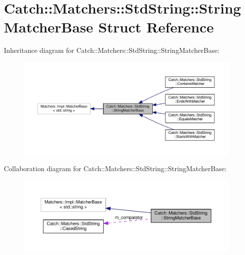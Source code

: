 \hypertarget{structCatch_1_1Matchers_1_1StdString_1_1StringMatcherBase}{}\section{Catch\+:\+:Matchers\+:\+:Std\+String\+:\+:String\+Matcher\+Base Struct Reference}
\label{structCatch_1_1Matchers_1_1StdString_1_1StringMatcherBase}


Inheritance diagram for Catch\+:\+:Matchers\+:\+:Std\+String\+:\+:String\+Matcher\+Base\+:\nopagebreak
\begin{figure}[H]
\begin{center}
\leavevmode
\includegraphics[width=350pt]{structCatch_1_1Matchers_1_1StdString_1_1StringMatcherBase__inherit__graph}
\end{center}
\end{figure}


Collaboration diagram for Catch\+:\+:Matchers\+:\+:Std\+String\+:\+:String\+Matcher\+Base\+:\nopagebreak
\begin{figure}[H]
\begin{center}
\leavevmode
\includegraphics[width=350pt]{structCatch_1_1Matchers_1_1StdString_1_1StringMatcherBase__coll__graph}
\end{center}
\end{figure}
